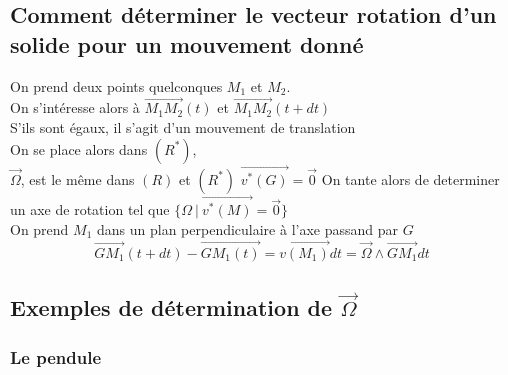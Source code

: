 \documentclass[../main.tex]{subfile}
\begin{document}
\subsection{Comment déterminer le vecteur rotation d'un solide pour un mouvement donné}
On prend deux points quelconques $M_1$ et $M_2$.\\
On s'intéresse alors à $\vec{M_1M_2}(t)$ et $\vec{M_1M_2}(t + dt)$\\
S'ils sont égaux, il s'agit d'un mouvement de translation\\






On se place alors dans $(R^*)$, \\
$\vec{\Omega}$, est le même dans $(R)$ et $(R^*)$
$\vec{v^*(G)} = \vec{0}$
On tante alors de determiner un axe de rotation tel que $\{\Omega \ | \ \vec{v^*(M)} = \vec{0}\}$\\
On prend $M_1$ dans un plan perpendiculaire à l'axe passand par $G$\\
$$\vec{GM_1}(t + dt) - \vec{GM_1(t)} = \vec{v(M_1)}dt = \vec{\Omega} \wedge \vec{GM_1} dt$$






\subsection{Exemples de détermination de $\vec{\Omega}$}
\subsubsection{Le pendule}
\end{document}
